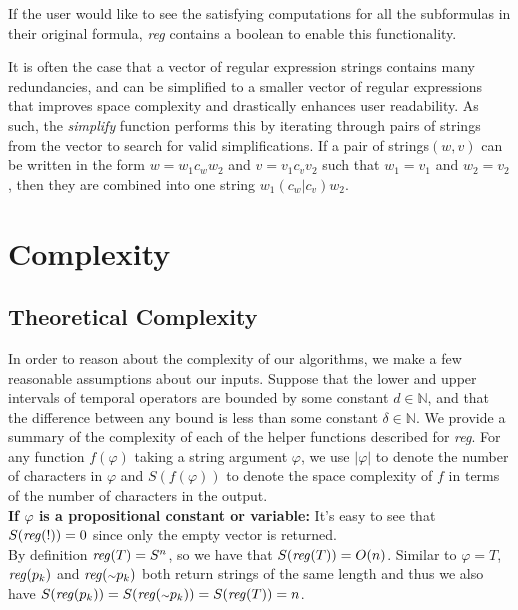 \documentclass[runningheads]{llncs}
\renewcommand{\phi}{\varphi}
\begin{document}
If the user would like to see the satisfying computations for all the subformulas in their original formula, \textit{reg} contains a boolean to enable this functionality. 

It is often the case that a vector of regular expression strings contains many redundancies, and can be simplified to a smaller vector of regular expressions that improves space complexity and drastically enhances user readability. 
As such, the \textit{simplify} function performs this by iterating through pairs of strings from the vector to search for valid simplifications. 
If a pair of strings$(w, v)$ can be written in the form $w = w_1 c_w w_2$ and $v = v_1 c_v v_2$ such that $w_1 = v_1$ and $w_2 = v_2$, then they are combined into one string $w_1 (c_w | c_v) w_2$.


\section{Complexity} \label{complex}

\subsection{Theoretical Complexity}
 In order to reason about the complexity of our algorithms, we make a few reasonable assumptions about our inputs.
Suppose that the lower and upper intervals of temporal operators are bounded by some constant $d \in \mathbb{N}$, and that the difference between any bound is less than some constant $\delta \in \mathbb{N}$. 
We provide a summary of the complexity of each of the helper functions described for \textit{reg}. 
For any function $f(\phi)$ taking a string argument $\phi$, we use $|\phi|$ to denote the number of characters in $\phi$ and $S(f(\phi))$ to denote the space complexity of $f$ in terms of the number of characters in the output.\\
 
\textbf{If $\phi$ is a propositional constant or variable:}
    It's easy to see that $S(\text{\emph{reg}}(!)) = 0$ since only the empty vector is returned. \\
    By definition $\text{\emph{reg}}(T) = S^n$, so we have that $S(\text{\emph{reg}}(T)) = O(n)$. Similar to $\phi = T$, $\text{\emph{reg}}(p_k)$ and $\text{\emph{reg}}(\scriptstyle{\sim} \textstyle p_k)$ both return strings of the same length and thus we also have $S(\text{\emph{reg}}(p_k)) = S(\text{\emph{reg}}(\scriptstyle{\sim} \textstyle p_k)) = S(\text{\emph{reg}}(T)) = n$.\\
 
\end{document}
